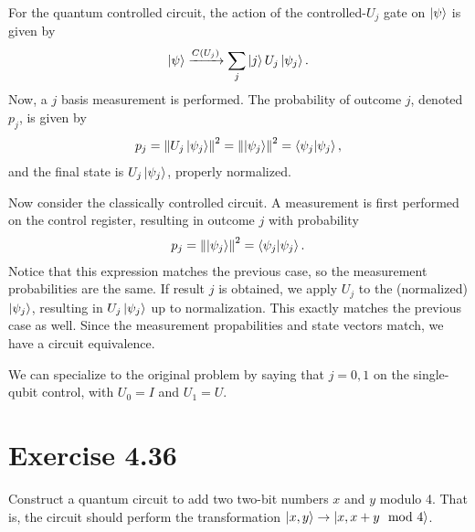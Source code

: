 \documentclass{book}
\begin{document}
    For the quantum controlled circuit, the action of the controlled-$U_j$ gate on $\ket{\psi}$ is given by
    \begin{align}
        \ket{\psi} \xrightarrow{C(U_j)} \sum_j \ket{j} U_j \ket{\psi_j}. 
    \end{align}
    Now, a $j$ basis measurement is performed. The probability of outcome $j$, denoted $p_j$, is given by
    \begin{align}
        p_j = \norm{U_j \ket{\psi_j}}^2 = \norm{\ket{\psi_j}}^2 = \bra{\psi_j}\ket{\psi_j},
    \end{align}
    and the final state is $U_j \ket{\psi_j}$, properly normalized. 

    Now consider the classically controlled circuit. A measurement is first performed on the control register, resulting in outcome $j$ with probability
    \begin{align}
        p_j = \norm{\ket{\psi_j}}^2 = \bra{\psi_j}\ket{\psi_j}.
    \end{align}
    Notice that this expression matches the previous case, so the measurement probabilities are the same. If result $j$ is obtained, we apply $U_j$ to the (normalized) $\ket{\psi_j}$, resulting in $U_j \ket{\psi_j}$ up to normalization. This exactly matches the previous case as well. Since the measurement propabilities and state vectors match, we have a circuit equivalence.

    We can specialize to the original problem by saying that $j = 0,1$ on the single-qubit control, with $U_0 = I$ and $U_1 = U$. 

\section*{Exercise 4.36}
    Construct a quantum circuit to add two two-bit numbers $x$ and $y$ modulo 4. That is, the circuit should perform the transformation $\ket{x,y} \rightarrow \ket{x, x+ y \mod{4}}$.
\end{document}
